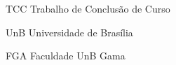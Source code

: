 \begin{siglas}

  \item[TCC] Trabalho de Conclusão de Curso
  \item[UnB] Universidade de Brasília
  \item[FGA] Faculdade UnB Gama

\end{siglas}
